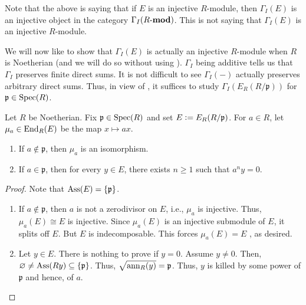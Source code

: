 \begin{rem}
	Note that the above is saying that if $E$ is an injective $R$-module, then $\Gamma_{I}(E)$ is an injective object in the category $\Gamma_{I}(R\text{-}\mathbf{mod})$. This is not saying that $\Gamma_{I}(E)$ is an injective $R$-module.
\end{rem}

We will now like to show that $\Gamma_{I}(E)$ is actually an injective $R$-module when $R$ is Noetherian (and we will do so without using ). $\Gamma_{I}$ being additive tells us that $\Gamma_{I}$ preserves finite direct sums. It is not difficult to see $\Gamma_{I}(-)$ actually preserves arbitrary direct sums. Thus, in view of , it suffices to study $\Gamma_{I}(E_{R}(R/\mathfrak{p}))$ for $\mathfrak{p} \in \operatorname{Spec}(R)$.


\begin{prop} \label{prop:multiplication-on-injective-hull}
	Let $R$ be Noetherian. Fix $\mathfrak{p} \in \operatorname{Spec}(R)$ and set $E \vcentcolon= E_{R}(R/\mathfrak{p})$. For $a \in R$, let $\mu_{a} \in \operatorname{End}_{R}(E)$ be the map $x \mapsto a x$. 
	\begin{enumerate}
		\item If $a \notin \mathfrak{p}$, then $\mu_{a}$ is an isomorphism.
		\item If $a \in \mathfrak{p}$, then for every $y \in E$, there exists $n \ge 1$ such that $a^{n} y = 0$.
	\end{enumerate}
\end{prop}
\begin{proof} 
	Note that $\operatorname{Ass}(E) = \{\mathfrak{p}\}$. 
	\begin{enumerate}
		\item If $a \notin \mathfrak{p}$, then $a$ is not a zerodivisor on $E$, i.e., $\mu_{a}$ is injective. Thus, $\mu_{a}(E) \cong E$ is injective. Since $\mu_{a}(E)$ is an injective submodule of $E$, it splits off $E$. But $E$ is indecomposable. This forces $\mu_{a}(E) = E$ , as desired.
		\item Let $y \in E$. There is nothing to prove if $y = 0$. Assume $y \neq 0$. Then, $\varnothing \neq \operatorname{Ass}(Ry) \subseteq \{\mathfrak{p}\}$. Thus, $\sqrt{\operatorname{ann}_{R}(y)} = \mathfrak{p}$. Thus, $y$ is killed by some power of $\mathfrak{p}$ and hence, of $a$. \qedhere
	\end{enumerate}
\end{proof}

